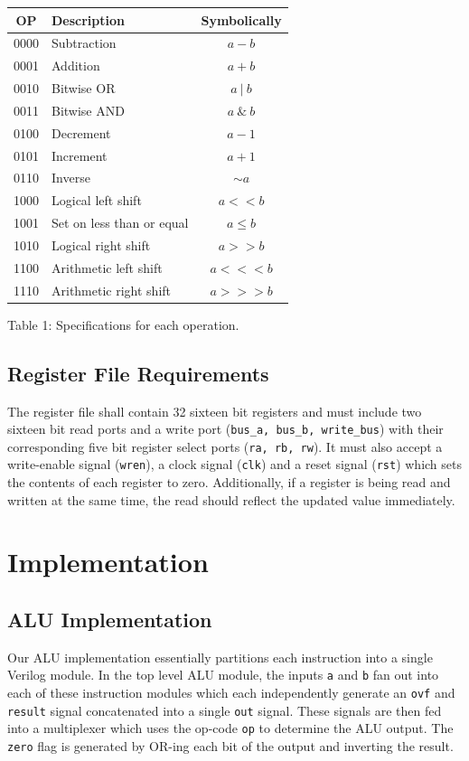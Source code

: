 \documentclass[11pt]{article}
\begin{document}
{\centering
\begin{tabular}{|c|l|c|}
	\hline
	\textbf{OP} & \textbf{Description} & \textbf{Symbolically}\\
	\hline
	0000 & Subtraction & $a - b$ \\
	0001 & Addition & $a + b$ \\
	0010 & Bitwise OR & $a~|~b$ \\
	0011 & Bitwise AND & $a~\&~b$ \\
	0100 & Decrement & $a - 1$ \\
	0101 & Increment & $a + 1$ \\
	0110 & Inverse & $\sim a$ \\
	1000 & Logical left shift & $a << b$ \\
	1001 & Set on less than or equal & $a \leq b$ \\
	1010 & Logical right shift & $a >> b$ \\
	1100 & Arithmetic left shift & $a <<< b$ \\
	1110 & Arithmetic right shift & $a >>> b$ \\
	\hline
\end{tabular} 

\vspace{12pt}
Table 1: Specifications for each operation.\par
} 

\subsection{Register File Requirements}
The register file shall contain 32 sixteen bit registers and must include two sixteen bit read ports and a write port (\texttt{bus\_a, bus\_b, write\_bus}) with their corresponding five bit register select ports (\texttt{ra, rb, rw}). It must also accept a write-enable signal (\texttt{wren}), a clock signal (\texttt{clk}) and a reset signal (\texttt{rst}) which sets the contents of each register to zero. Additionally, if a register is being read and written at the same time, the read should reflect the updated value immediately. 

\section{Implementation}
\subsection{ALU Implementation}
Our ALU implementation essentially partitions each instruction into a single Verilog module. In the top level ALU module, the inputs \texttt{a} and \texttt{b} fan out into each of these instruction modules which each independently generate an \texttt{ovf} and \texttt{result} signal concatenated into a single \texttt{out} signal. These signals are then fed into a multiplexer which uses the op-code \texttt{op} to determine the ALU output. The \texttt{zero} flag is generated by OR-ing each bit of the output and inverting the result.
\end{document}
